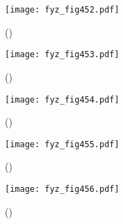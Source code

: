     \begin{figure}[ht!] %
      \centering
      \texttt{[image: fyz\_fig452.pdf]}
      \caption{ 
               (\cite[s.~707]{Feynman01})}
      \label{fyz_fig452}
    \end{figure}
    
    \begin{figure}[ht!] %
      \centering
      \texttt{[image: fyz\_fig453.pdf]}
      \caption{ 
               (\cite[s.~707]{Feynman01})}
      \label{fyz_fig453}
    \end{figure}
    
    \begin{figure}[ht!] %
      \centering
      \texttt{[image: fyz\_fig454.pdf]}
      \caption{ 
               (\cite[s.~707]{Feynman01})}
      \label{fyz_fig454}
    \end{figure}
    
    \begin{figure}[ht!] %
      \centering
      \texttt{[image: fyz\_fig455.pdf]}
      \caption{ 
               (\cite[s.~707]{Feynman01})}
      \label{fyz_fig455}
    \end{figure}
    
    \begin{figure}[ht!] %
      \centering
      \texttt{[image: fyz\_fig456.pdf]}
      \caption{ 
               (\cite[s.~707]{Feynman01})}
      \label{fyz_fig456}
    \end{figure}
    
\printbibliography[title={Seznam literatury}, heading=subbibliography]
